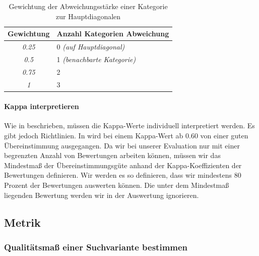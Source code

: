 \begin{table}[H]
\centering
\vspace{-.5em}
\caption[Gewichtung der Abweichungsstärke einer Kategorie zur Hauptdiagonalen]{Gewichtung der Abweichungsstärke einer Kategorie zur Hauptdiagonalen}
\label{tab:GewichtungAbweichungenKappaBerechnung}
\vspace{-.5em}
\footnotesize
\renewcommand*{\arraystretch}{1.2}
\begin{tabular}{cl}
\hline
\multicolumn{1}{l}{\textbf{Gewichtung}} & \textbf{Anzahl Kategorien Abweichung} \\ \hline
\textit{0.25}                                     & 0 \textit{(auf Hauptdiagonal)}                 \\ 
\textit{0.5}                                      & 1 \textit{(benachbarte Kategorie)}             \\ 
\textit{0.75}                                     & 2                                     \\ 
\textit{1}                                        & 3                                     \\ \hline
\end{tabular}
\vspace{-1.5em}
\end{table}

\paragraph{Kappa interpretieren}

Wie in \cite{KappaWerte} beschrieben, müssen die Kappa-Werte individuell interpretiert werden. Es gibt jedoch Richtlinien. In \cite{Kappa} wird bei einem Kappa-Wert ab 0.60 von einer guten Übereinstimmung ausgegangen. Da wir bei unserer Evaluation nur mit einer begrenzten Anzahl von Bewertungen arbeiten können, müssen wir das Mindestmaß der Übereinstimmungsgüte anhand der Kappa-Koeffizienten der Bewertungen definieren. Wir werden es so definieren, dass wir mindestens 80 Prozent der Bewertungen auswerten können. Die unter dem Mindestmaß liegenden Bewertung werden wir in der Auswertung ignorieren. 

\subsection{Metrik}
\label{sec:Evaluation:Aufbau:Metrik}

\subsubsection{Qualitätsmaß einer Suchvariante bestimmen}
\label{sec:Evaluation:Aufbau:Metrik:QualitaetMessen}

